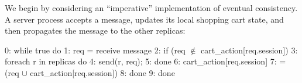 We begin by considering an ``imperative''  implementation of eventual consistency. A
server process accepts a message, updates its local shopping cart
state, and then propagates the message to the other replicas:






\begin{Dedalus}
0: while true do
1:  req = receive message
2:  if (req \(\notin\) cart_action[req.session])
3:    foreach r in replicas do
4:      send(r, req);
5:    done
6:    cart_action[req.session]
7:      = (req \(\cup\) cart_action[req.session]) 
8:  done
9: done
\end{Dedalus}

